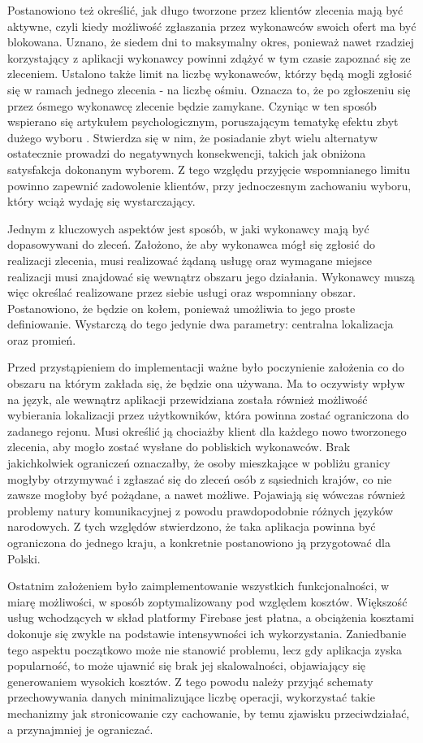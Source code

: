 Postanowiono też określić, jak długo tworzone przez klientów zlecenia mają być aktywne, czyli kiedy możliwość zgłaszania przez wykonawców swoich ofert ma być blokowana. Uznano, że siedem dni to maksymalny okres, ponieważ nawet rzadziej korzystający z aplikacji wykonawcy powinni zdążyć w tym czasie zapoznać się ze zleceniem. Ustalono także limit na liczbę wykonawców, którzy będą mogli zgłosić się w ramach jednego zlecenia - na liczbę ośmiu. Oznacza to, że po zgłoszeniu się przez ósmego wykonawcę zlecenie będzie zamykane. Czyniąc w ten sposób wspierano się artykułem psychologicznym, poruszającym tematykę efektu zbyt dużego wyboru \cite{choice-complexity}. Stwierdza się w nim, że posiadanie zbyt wielu alternatyw ostatecznie prowadzi do negatywnych konsekwencji, takich jak obniżona satysfakcja dokonanym wyborem. Z tego względu przyjęcie wspomnianego limitu powinno zapewnić zadowolenie klientów, przy jednoczesnym zachowaniu wyboru, który wciąż wydaję się wystarczający.

Jednym z kluczowych aspektów jest sposób, w jaki wykonawcy mają być dopasowywani do zleceń. Założono, że aby wykonawca mógł się zgłosić do realizacji zlecenia, musi realizować żądaną usługę oraz wymagane miejsce realizacji musi znajdować się wewnątrz obszaru jego działania. Wykonawcy muszą więc określać realizowane przez siebie usługi oraz wspomniany obszar. Postanowiono, że będzie on kołem, ponieważ umożliwia to jego proste definiowanie. Wystarczą do tego jedynie dwa parametry: centralna lokalizacja oraz promień.

Przed przystąpieniem do implementacji ważne było poczynienie założenia co do obszaru na którym zakłada się, że będzie ona używana. Ma to oczywisty wpływ na język, ale wewnątrz aplikacji przewidziana została również możliwość wybierania lokalizacji przez użytkowników, która powinna zostać ograniczona do zadanego rejonu. Musi określić ją chociażby klient dla każdego nowo tworzonego zlecenia, aby mogło zostać wysłane do pobliskich wykonawców. Brak jakichkolwiek ograniczeń oznaczałby, że osoby mieszkające w pobliżu granicy mogłyby otrzymywać i zgłaszać się do zleceń osób z sąsiednich krajów, co nie zawsze mogłoby być pożądane, a nawet możliwe. Pojawiają się wówczas również problemy natury komunikacyjnej z powodu prawdopodobnie różnych języków narodowych. Z tych względów stwierdzono, że taka aplikacja powinna być ograniczona do jednego kraju, a konkretnie postanowiono ją przygotować dla Polski.

Ostatnim założeniem było zaimplementowanie wszystkich funkcjonalności, w miarę możliwości, w sposób zoptymalizowany pod względem kosztów. Większość usług wchodzących w skład platformy Firebase jest płatna, a obciążenia kosztami dokonuje się zwykle na podstawie intensywności ich wykorzystania. Zaniedbanie tego aspektu początkowo może nie stanowić problemu, lecz gdy aplikacja zyska popularność, to może ujawnić się brak jej skalowalności, objawiający się generowaniem wysokich kosztów. Z tego powodu należy przyjąć schematy przechowywania danych minimalizujące liczbę operacji, wykorzystać takie mechanizmy jak stronicowanie czy cachowanie, by temu zjawisku przeciwdziałać, a przynajmniej je ograniczać.
